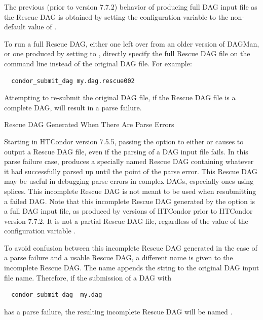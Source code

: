 The previous (prior to version 7.7.2) behavior of producing full DAG input file 
as the Rescue DAG 
is obtained by setting the configuration variable
 to the non-default 
value of .  

To run a full Rescue DAG,
either one left over from an older version of DAGMan, 
or one produced by setting  
to , 
directly specify the full Rescue DAG file on the command line
instead of the original DAG file.
For example:

\begin{verbatim}
  condor_submit_dag my.dag.rescue002
\end{verbatim}

Attempting to re-submit the original DAG file, if the Rescue DAG file
is a complete DAG, will result in a parse failure.


\label{dagman:rescue_parse_error}
\begin{description}
\item[Rescue DAG Generated When There Are Parse Errors]
\end{description}

Starting in HTCondor version 7.5.5, passing
the  option to either  or 
causes  to output a Rescue DAG file, 
even if the parsing of a DAG input file fails.
In this parse failure case,  produces a specially 
named Rescue DAG containing whatever it had successfully parsed up
until the point of the parse error.
This Rescue DAG may be useful in debugging parse errors in complex DAGs,
especially ones using splices.
This incomplete Rescue DAG is not meant to be used when resubmitting
a failed DAG.  
Note that this incomplete Rescue DAG generated by the 
option is a full DAG input file, 
as produced by versions of HTCondor prior to HTCondor version 7.7.2.
It is not a partial Rescue DAG file,
regardless of the value of the configuration variable
.

To avoid confusion between this incomplete Rescue DAG
generated in the case of a parse failure and a usable Rescue DAG,
a different name is given to the incomplete Rescue DAG.
The name appends the string  to the original
DAG input file name.
Therefore, if the submission of a DAG with
\begin{verbatim}
  condor_submit_dag  my.dag
\end{verbatim}
has a parse failure, the resulting incomplete Rescue DAG will be
named .

